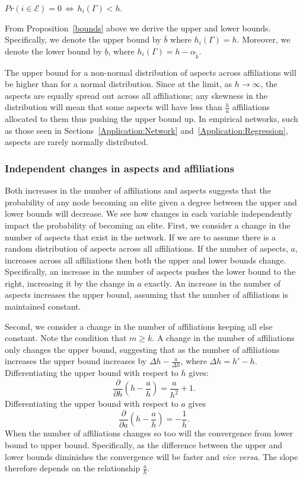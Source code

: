 \begin{subappendices}
\begin{proposition}
\begin{abet}
\item $Pr(i \in \mathcal{E}) = 0 \, \iff \, h_{i}(\Gamma) < h$.
\end{abet}
\end{proposition}

From Proposition~\ref{bounds} above we derive the upper and lower bounds. Specifically, we denote the upper bound by $\overline{b}$ where $h_{i}(\Gamma) = h$. Moreover, we denote the lower bound by $\underline{b}$, where $h_{i}(\Gamma) = h - \alpha_{\tilde{k}}$.

The upper bound for a non-normal distribution of aspects across affiliations will be higher than for a normal distribution. Since at the limit, as $h \rightarrow \infty$, the aspects are equally spread out across all affiliations; any skewness in the distribution will mean that some aspects will have less than $\frac{h}{a}$ affiliations allocated to them thus pushing the upper bound up. In empirical networks, such as those seen in Sections~\ref{Application:Network} and~\ref{Application:Regression}, aspects are rarely normally distributed.

\subsubsection*{Independent changes in aspects and affiliations}

Both increases in the number of affiliations and aspects suggests that the probability of any node becoming an elite given a degree between the upper and lower bounds will decrease. We see how changes in each variable independently impact the probability of becoming an elite. First, we consider a change in the number of aspects that exist in the network. If we are to assume there is a random distribution of aspects across all affiliations. If the number of aspects, $a$, increases across all affiliations then both the upper and lower bounds change. Specifically, an increase in the number of aspects pushes the lower bound to the right, increasing it by the change in $a$ exactly. An increase in the number of aspects increases the upper bound, assuming that the number of affiliations is maintained constant.

Second, we consider a change in the number of affiliations keeping all else constant. Note the condition that $m \geqslant k$. A change in the number of affiliations only changes the upper bound, suggesting that as the number of affiliations increases the upper bound increases by $\Delta h - \frac{a}{\Delta h}$, where $\Delta h = h' - h$. Differentiating the upper bound with respect to $h$ gives:
\[
\frac{\partial}{\partial h} \left( h - \frac{a}{h} \right) = \frac{a}{h^{2}} + 1 .
\]
Differentiating the upper bound with respect to $a$ gives
\[
\frac{\partial}{\partial a} \left( h - \frac{a}{h} \right) = - \frac{1}{h} .
\]
When the number of affiliations changes so too will the convergence from lower bound to upper bound. Specifically, as the difference between the upper and lower bounds diminishes the convergence will be faster and \emph{vice versa}. The slope therefore depends on the relationship $\frac{a}{h}$.


\end{subappendices}
